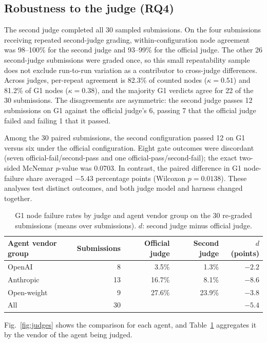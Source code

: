 \documentclass[preprint,12pt,authoryear]{elsarticle}
\begin{document}
\subsection{Robustness to the judge (RQ4)}\label{sec:res-judge2}

The second judge completed all 30 sampled submissions. On the four submissions receiving repeated second-judge grading, within-configuration node agreement was 98--100\% for the second judge and 93--99\% for the official judge. The other 26 second-judge submissions were graded once, so this small repeatability sample does not exclude run-to-run variation as a contributor to cross-judge differences. Across judges, per-repeat agreement is 82.3\% of counted nodes ($\kappa=0.51$) and 81.2\% of G1 nodes ($\kappa=0.38$), and the majority G1 verdicts agree for 22 of the 30 submissions. The disagreements are asymmetric: the second judge passes 12 submissions on G1 against the official judge's 6, passing 7 that the official judge failed and failing 1 that it passed.

Among the 30 paired submissions, the second configuration passed 12 on G1 versus six under the official configuration. Eight gate outcomes were discordant (seven official-fail/second-pass and one official-pass/second-fail); the exact two-sided McNemar $p$-value was 0.0703. In contrast, the paired difference in G1 node-failure share averaged $-5.43$ percentage points (Wilcoxon $p=0.0138$). These analyses test distinct outcomes, and both judge model and harness changed together.

\begin{table}[t]
\centering
\caption{G1 node failure rates by judge and agent vendor group on the 30 re-graded submissions (means over submissions). $d$: second judge minus official judge.}
\label{tab:vendor}
\footnotesize
\begin{tabular}{@{}lrrrr@{}}
\toprule
Agent vendor group & Submissions & Official judge & Second judge & $d$ (points)\\
\midrule
OpenAI & 8 & 3.5\% & 1.3\% & $-2.2$\\
Anthropic & 13 & 16.7\% & 8.1\% & $-8.6$\\
Open-weight & 9 & 27.6\% & 23.9\% & $-3.8$\\
\midrule
All & 30 & & & $-5.4$\\
\bottomrule
\end{tabular}
\end{table}

Fig.~\ref{fig:judges} shows the comparison for each agent, and Table~\ref{tab:vendor} aggregates it by the vendor of the agent being judged.
\end{document}

